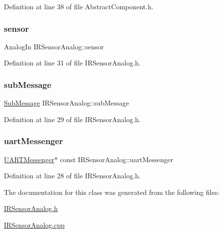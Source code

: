 Definition at line 38 of file Abstract\+Component.\+h.

\mbox{\label{class_i_r_sensor_analog_a90a5052f0d0f71bf2518fac4b5dd9dc0}} 
\subsubsection{\texorpdfstring{sensor}{sensor}}
{\footnotesize\ttfamily Analog\+In I\+R\+Sensor\+Analog\+::sensor\hspace{0.3cm}{\ttfamily [private]}}



Definition at line 31 of file I\+R\+Sensor\+Analog.\+h.

\mbox{\label{class_i_r_sensor_analog_a6f3d8032be77b223aa78381c713197c3}} 
\subsubsection{\texorpdfstring{sub\+Message}{subMessage}}
{\footnotesize\ttfamily \hyperlink{struct_sub_message}{Sub\+Message} I\+R\+Sensor\+Analog\+::sub\+Message\hspace{0.3cm}{\ttfamily [private]}}



Definition at line 29 of file I\+R\+Sensor\+Analog.\+h.

\mbox{\label{class_i_r_sensor_analog_abdd70ea1abffd1323989af062dab0aeb}} 
\subsubsection{\texorpdfstring{uart\+Messenger}{uartMessenger}}
{\footnotesize\ttfamily \hyperlink{class_u_a_r_t_messenger}{U\+A\+R\+T\+Messenger}$\ast$ const I\+R\+Sensor\+Analog\+::uart\+Messenger\hspace{0.3cm}{\ttfamily [private]}}



Definition at line 28 of file I\+R\+Sensor\+Analog.\+h.



The documentation for this class was generated from the following files\+:\begin{DoxyCompactItemize}
\item 
\hyperlink{_i_r_sensor_analog_8h}{I\+R\+Sensor\+Analog.\+h}\item 
\hyperlink{_i_r_sensor_analog_8cpp}{I\+R\+Sensor\+Analog.\+cpp}\end{DoxyCompactItemize}

